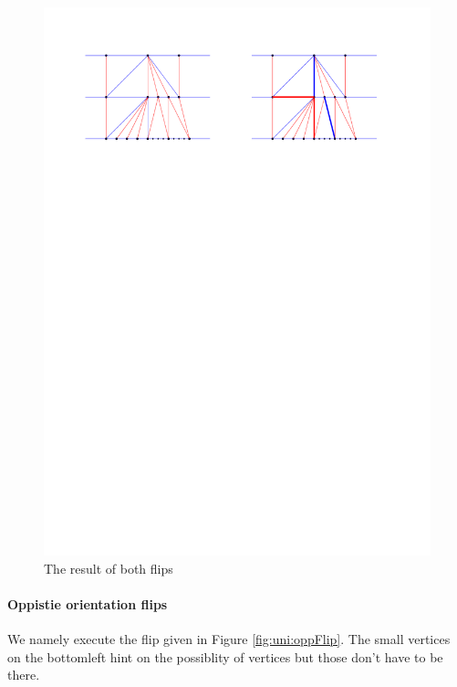  \begin{figure}[h]
   \centering
   \includegraphics[width =\textwidth]{unifiedAlgo/img/post/sameFlipComplete}
   \caption{The result of both flips}
   \label{fig:uni:sameFlipComplete}
 \end{figure}



 \paragraph{Oppistie orientation flips}
 We namely execute the flip given in Figure \ref{fig:uni:oppFlip}. The small vertices on the bottomleft hint on the possiblity of vertices but those don't have to be there.

